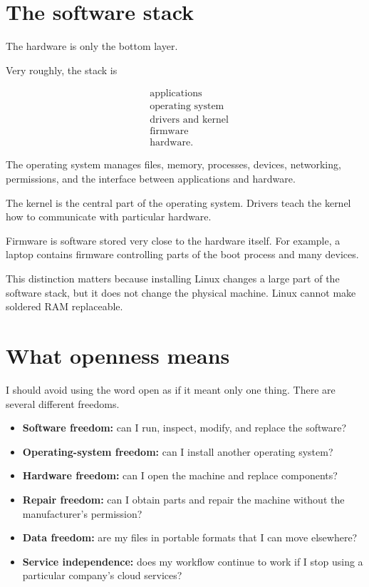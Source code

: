 \section{The software stack}
\label{section-computing-systems-software}

The hardware is only the bottom layer.

Very roughly, the stack is

$$
\begin{aligned}
&\text{applications}\\
&\text{operating system}\\
&\text{drivers and kernel}\\
&\text{firmware}\\
&\text{hardware}.
\end{aligned}
$$

The operating system manages files,
memory, processes, devices, networking,
permissions, and the interface between
applications and hardware.

The kernel is the central part of the
operating system.  Drivers teach the
kernel how to communicate with particular
hardware.

Firmware is software stored very close to
the hardware itself.  For example, a
laptop contains firmware controlling parts
of the boot process and many devices.

This distinction matters because
installing Linux changes a large part
of the software stack, but it does not
change the physical machine.  Linux cannot
make soldered RAM replaceable.

\section{What openness means}
\label{section-computing-systems-openness}

I should avoid using the word open as if
it meant only one thing.  There are
several different freedoms.

\begin{itemize}
\item {\bf Software freedom:} can I run,
inspect, modify, and replace the software?
\item {\bf Operating-system freedom:} can
I install another operating system?
\item {\bf Hardware freedom:} can I open
the machine and replace components?
\item {\bf Repair freedom:} can I obtain
parts and repair the machine without the
manufacturer's permission?
\item {\bf Data freedom:} are my files in
portable formats that I can move elsewhere?
\item {\bf Service independence:} does my
workflow continue to work if I stop using
a particular company's cloud services?
\end{itemize}

